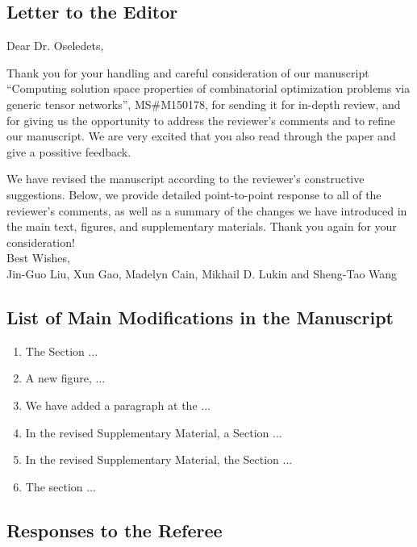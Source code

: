 \documentclass[longbibliography]{article}
\date{}
\begin{document}
\subsection{Letter to the Editor}\label{header-n558}

Dear Dr. Oseledets,

Thank you for your handling and careful consideration of our manuscript ``Computing solution space properties of combinatorial optimization problems via generic tensor networks'', MS\#M150178, for sending it for in-depth review, and for giving us the opportunity to address the reviewer's comments and to refine our manuscript. 
We are very excited that you also read through the paper and give a possitive feedback.

We have revised the manuscript according to the reviewer's constructive suggestions.
Below, we provide detailed point-to-point response to all of the reviewer's comments, as well as a summary of the changes we have introduced in the main text, figures, and supplementary materials. Thank you again for your consideration! \\

Best Wishes,\\
Jin-Guo Liu, Xun Gao, Madelyn Cain, Mikhail D. Lukin and Sheng-Tao Wang


\subsection{List of Main Modifications in the Manuscript}\label{header-n30}
\begin{enumerate}
\def\labelenumi{\arabic{enumi}.}
\item The Section ...
\item A new figure, ...
\item We have added a paragraph at the ...
\item In the revised Supplementary Material, a Section ...
\item In the revised Supplementary Material, the Section ...
\item The section ...
\end{enumerate}



\subsection{Responses to the Referee}
\end{document}
